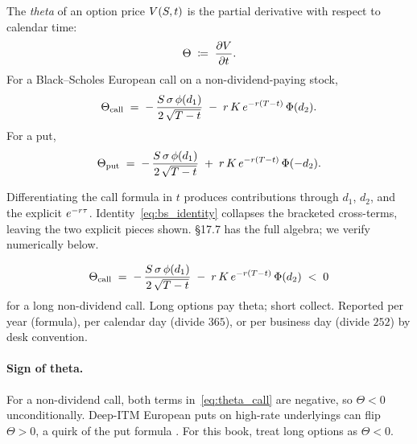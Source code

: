 \begin{definition}[Theta]
The \emph{theta} of an option price $V(S, t)$ is the partial
derivative with respect to calendar time:
\begin{equation}
  \Theta \;\coloneqq\; \frac{\partial V}{\partial t}.
  \label{eq:theta_def}
\end{equation}
For a Black--Scholes European call on a non-dividend-paying stock,
\begin{equation}
  \Theta_{\text{call}}
    \;=\; -\,\frac{S\,\sigma\,\phi(d_1)}{2\,\sqrt{T - t}}
       \;-\; r\,K\,e^{-r(T - t)}\,\Phi(d_2).
  \label{eq:theta_call}
\end{equation}
For a put,
\begin{equation*}
  \Theta_{\text{put}}
    \;=\; -\,\frac{S\,\sigma\,\phi(d_1)}{2\,\sqrt{T - t}}
       \;+\; r\,K\,e^{-r(T - t)}\,\Phi(-d_2).
\end{equation*}
\end{definition}

Differentiating the call formula in $t$ produces contributions
through $d_1$, $d_2$, and the explicit $e^{-r \tau}$.
Identity~\eqref{eq:bs_identity} collapses the bracketed cross-terms,
leaving the two explicit pieces shown. \citeHull \S17.7 has the
full algebra; we verify numerically below.

\begin{keyfactbox}
\begin{equation*}
  \Theta_{\text{call}}
   \;=\; -\,\frac{S\,\sigma\,\phi(d_1)}{2\,\sqrt{T - t}}
       \;-\; r\,K\,e^{-r(T - t)}\,\Phi(d_2)
   \;<\; 0
\end{equation*}
for a long non-dividend call. Long options pay theta; short
collect. Reported per year (formula), per calendar day
(divide $365$), or per business day (divide $252$) by desk
convention.
\end{keyfactbox}

\paragraph{Sign of theta.}
For a non-dividend call, both terms in~\eqref{eq:theta_call} are
negative, so $\Theta < 0$ unconditionally. Deep-ITM European puts
on high-rate underlyings can flip $\Theta > 0$, a quirk of the
put formula \citeHull. For this book, treat long options as
$\Theta < 0$.

